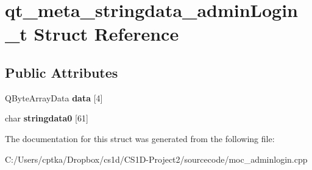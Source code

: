 \hypertarget{structqt__meta__stringdata__admin_login__t}{}\section{qt\+\_\+meta\+\_\+stringdata\+\_\+admin\+Login\+\_\+t Struct Reference}
\label{structqt__meta__stringdata__admin_login__t}
\subsection*{Public Attributes}
\begin{DoxyCompactItemize}
\item 
\mbox{\label{structqt__meta__stringdata__admin_login__t_af6c5111dea38d1e9d01503ab5acbdad5}} 
Q\+Byte\+Array\+Data {\bfseries data} \mbox{[}4\mbox{]}
\item 
\mbox{\label{structqt__meta__stringdata__admin_login__t_ab9362296a6bd9f2f60043d5f15656d3d}} 
char {\bfseries stringdata0} \mbox{[}61\mbox{]}
\end{DoxyCompactItemize}


The documentation for this struct was generated from the following file\+:\begin{DoxyCompactItemize}
\item 
C\+:/\+Users/cptka/\+Dropbox/cs1d/\+C\+S1\+D-\/\+Project2/sourcecode/moc\+\_\+adminlogin.\+cpp\end{DoxyCompactItemize}

